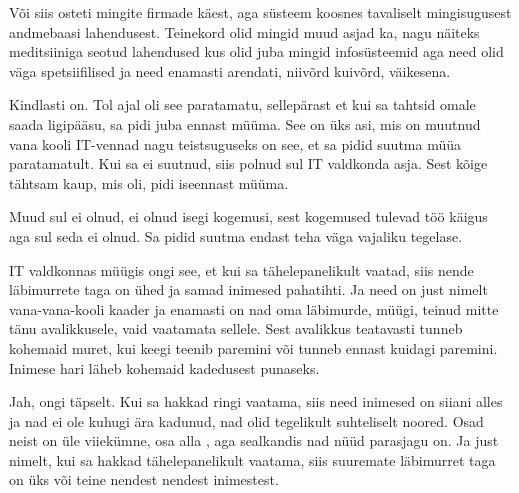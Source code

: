 
Või siis osteti mingite firmade käest, aga süsteem koosnes tavaliselt 
mingisugusest andmebaasi lahendusest. Teinekord olid mingid muud asjad ka, nagu 
näiteks  meditsiiniga seotud lahendused kus olid juba mingid infosüsteemid aga 
need olid väga spetsiifilised ja need enamasti arendati, niivõrd kuivõrd, 
väikesena.


Kindlasti on. Tol ajal oli see paratamatu, sellepärast et kui sa tahtsid omale 
saada ligipääsu, sa pidi juba ennast müüma. See on üks asi, mis on muutnud  
vana kooli IT-vennad nagu teistsuguseks on see, et sa pidid suutma müüa 
paratamatult. Kui sa ei suutnud, siis polnud sul IT valdkonda asja. Sest kõige 
tähtsam kaup, mis oli, pidi  iseennast müüma.


Muud sul ei olnud, ei olnud isegi kogemusi, sest kogemused tulevad töö käigus 
aga sul seda ei olnud. Sa pidid suutma endast teha väga vajaliku tegelase.


IT valdkonnas müügis ongi see, et kui sa tähelepanelikult vaatad, siis nende 
läbimurrete taga on ühed ja samad inimesed pahatihti. Ja  need on just nimelt 
vana-vana-kooli kaader ja enamasti on nad oma läbimurde, müügi, teinud mitte 
tänu  avalikkusele, vaid vaatamata sellele. Sest avalikkus teatavasti tunneb 
kohemaid muret, kui keegi teenib paremini või tunneb ennast kuidagi paremini. 
Inimese hari läheb kohemaid kadedusest punaseks.
               
  
Jah, ongi täpselt. Kui sa hakkad ringi vaatama, siis need inimesed on siiani 
alles ja nad ei ole kuhugi ära kadunud, nad olid tegelikult suhteliselt noored. 
Osad neist on üle viiekümne, osa alla , aga sealkandis nad nüüd parasjagu on. 
Ja just nimelt, kui sa hakkad tähelepanelikult vaatama, siis suuremate 
läbimurret taga on üks või teine nendest nendest inimestest.
                 
